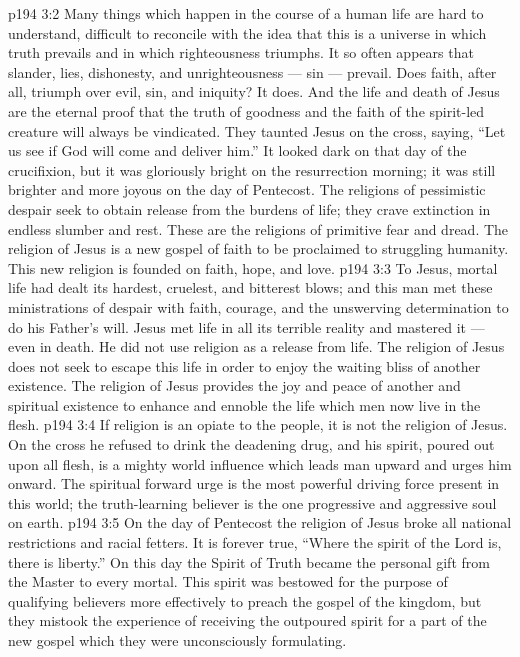 \vs p194 3:2 Many things which happen in the course of a human life are hard to understand, difficult to reconcile with the idea that this is a universe in which truth prevails and in which righteousness triumphs. It so often appears that slander, lies, dishonesty, and unrighteousness --- sin --- prevail. Does faith, after all, triumph over evil, sin, and iniquity? It does. And the life and death of Jesus are the eternal proof that the truth of goodness and the faith of the spirit\hyp{}led creature will always be vindicated. They taunted Jesus on the cross, saying, “Let us see if God will come and deliver him.” It looked dark on that day of the crucifixion, but it was gloriously bright on the resurrection morning; it was still brighter and more joyous on the day of Pentecost. The religions of pessimistic despair seek to obtain release from the burdens of life; they crave extinction in endless slumber and rest. These are the religions of primitive fear and dread. The religion of Jesus is a new gospel of faith to be proclaimed to struggling humanity. This new religion is founded on faith, hope, and love.
\vs p194 3:3 To Jesus, mortal life had dealt its hardest, cruelest, and bitterest blows; and this man met these ministrations of despair with faith, courage, and the unswerving determination to do his Father’s will. Jesus met life in all its terrible reality and mastered it --- even in death. He did not use religion as a release from life. The religion of Jesus does not seek to escape this life in order to enjoy the waiting bliss of another existence. The religion of Jesus provides the joy and peace of another and spiritual existence to enhance and ennoble the life which men now live in the flesh.
\vs p194 3:4 If religion is an opiate to the people, it is not the religion of Jesus. On the cross he refused to drink the deadening drug, and his spirit, poured out upon all flesh, is a mighty world influence which leads man upward and urges him onward. The spiritual forward urge is the most powerful driving force present in this world; the truth\hyp{}learning believer is the one progressive and aggressive soul on earth.
\vs p194 3:5 On the day of Pentecost the religion of Jesus broke all national restrictions and racial fetters. It is forever true, “Where the spirit of the Lord is, there is liberty.” On this day the Spirit of Truth became the personal gift from the Master to every mortal. This spirit was bestowed for the purpose of qualifying believers more effectively to preach the gospel of the kingdom, but they mistook the experience of receiving the outpoured spirit for a part of the new gospel which they were unconsciously formulating.
